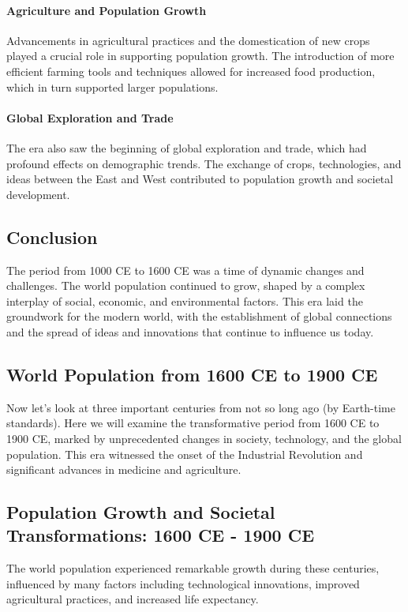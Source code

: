 \documentclass[a4paper,12pt]{book}
\begin{document}
\paragraph{Agriculture and Population Growth}
Advancements in agricultural practices and the domestication of new crops played a crucial role in supporting population growth. The introduction of more efficient farming tools and techniques allowed for increased food production, which in turn supported larger populations.

\paragraph{Global Exploration and Trade}
The era also saw the beginning of global exploration and trade, which had profound effects on demographic trends. The exchange of crops, technologies, and ideas between the East and West contributed to population growth and societal development.

\subsection*{Conclusion}
The period from 1000 CE to 1600 CE was a time of dynamic changes and challenges. The world population continued to grow, shaped by a complex interplay of social, economic, and environmental factors. This era laid the groundwork for the modern world, with the establishment of global connections and the spread of ideas and innovations that continue to influence us today.

\subsection*{World Population from 1600 CE to 1900 CE}
Now let's look at three important centuries from not so long ago (by Earth-time standards). Here we will examine the transformative period from 1600 CE to 1900 CE, marked by unprecedented changes in society, technology, and the global population. This era witnessed the onset of the Industrial Revolution and significant advances in medicine and agriculture.

\subsection*{Population Growth and Societal Transformations: 1600 CE - 1900 CE}
The world population experienced remarkable growth during these centuries, influenced by many factors including technological innovations, improved agricultural practices, and increased life expectancy.
\end{document}
